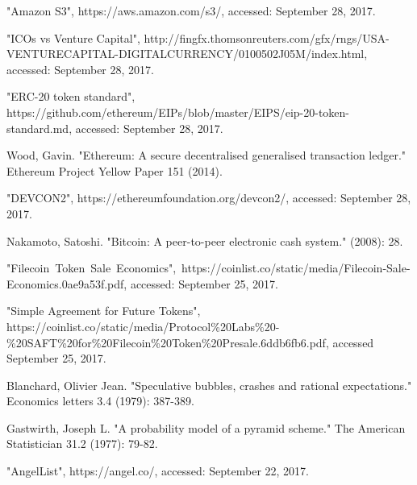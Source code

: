 \documentclass[journal]{IEEEtran}
\begin{document}
%
%
%
\begin{thebibliography}{1}

 "Amazon S3", https://aws.amazon.com/s3/, accessed: September 28, 2017.

 "ICOs vs Venture Capital", http://fingfx.thomsonreuters.com/gfx/rngs/USA-VENTURECAPITAL-DIGITALCURRENCY/0100502J05M/index.html, accessed: September 28, 2017.

 "ERC-20 token standard", https://github.com/ethereum/EIPs/blob/master/EIPS/eip-20-token-standard.md, accessed: September 28, 2017.

 Wood, Gavin. "Ethereum: A secure decentralised generalised transaction ledger." Ethereum Project Yellow Paper 151 (2014).

 "DEVCON2", https://ethereumfoundation.org/devcon2/, accessed: September 28, 2017.

 Nakamoto, Satoshi. "Bitcoin: A peer-to-peer electronic cash system." (2008): 28.

 "Filecoin Token Sale Economics", https://coinlist.co/static/media/Filecoin-Sale-Economics.0ae9a53f.pdf, accessed: September 25, 2017.

 "Simple Agreement for Future Tokens", https://coinlist.co/static/media/Protocol\%20Labs\%20-\%20SAFT\%20for\%20Filecoin\%20Token\%20Presale.6ddb6fb6.pdf, accessed September 25, 2017.

 Blanchard, Olivier Jean. "Speculative bubbles, crashes and rational expectations." Economics letters 3.4 (1979): 387-389. %

 Gastwirth, Joseph L. "A probability model of a pyramid scheme." The American Statistician 31.2 (1977): 79-82.

 "AngelList", https://angel.co/, accessed: September 22, 2017.


\end{thebibliography}
\end{document}
